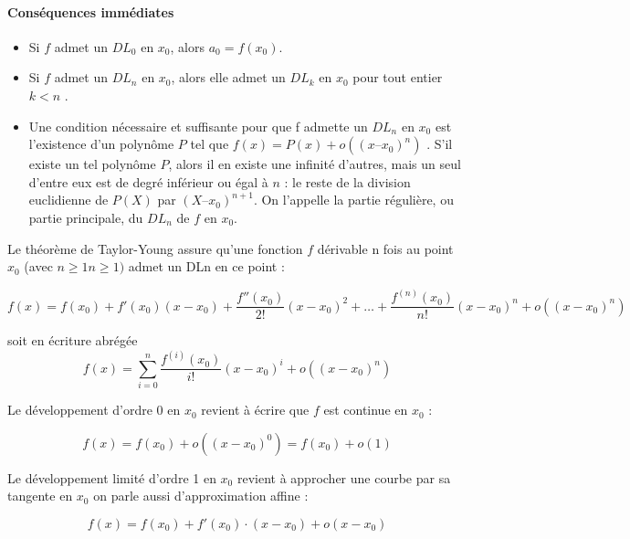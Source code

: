 		\paragraph*{Conséquences immédiates}
		\begin{itemize}
			\item Si $f$ admet un $DL_0$ en $x_0$, alors $a_0 = f(x_0)$. \cite{coulombeau2013math}
			\item Si $f$ admet un $DL_n$ en $x_0$, alors elle admet un $DL_k$ en $x_0$ pour tout entier $k < n$ \cite{coulombeau2013math}.
			\item Une condition nécessaire et suffisante pour que f admette un $DL_n$ en $x_0$ est l'existence d'un polynôme $P$ tel que $f(x) = P(x) + o((x – x_0)^n)$ \cite{coulombeau2013math}. S'il existe un tel polynôme $P$, alors il en existe une infinité d'autres, mais un seul d'entre eux est de degré inférieur ou égal à $n$ : le reste de la division euclidienne de $P(X)$ par $(X – x_0)^{n+1}$. On l'appelle la partie régulière, ou partie principale, du $DL_n$ de $f$ en $x_0$. %
		\end{itemize}
		
		
			
		Le théorème de Taylor-Young assure \cite{coulombeau2013math} qu'une fonction $f$ dérivable n fois au point $x_0$ (avec ${\displaystyle n\geq 1}n\geq 1)$ admet un DLn en ce point :
		
		$$
			{\displaystyle f(x)=f(x_{0})+f'(x_{0})(x-x_{0})+{\frac {f''(x_{0})}{2!}}(x-x_{0})^{2}+\dots +{\frac {f^{(n)}(x_{0})}{n!}}(x-x_{0})^{n}+o((x-x_{0})^{n})}
		$$
		
		soit en écriture abrégée
		$$
			f(x)=\sum _{{i=0}}^{n}{\frac  {f^{{(i)}}(x_{0})}{i!}}(x-x_{0})^{i}+o((x-x_{0})^{n})
		$$
		
		Le développement d'ordre $0$ en $x_0$ revient à écrire que $f$ est continue en $x_0$ :
		
		$$
		{\displaystyle f(x)=f(x_{0})+o((x-x_{0})^{0})=f(x_{0})+o(1)}
		$$
		
		Le développement limité d'ordre 1 en $x_0$ revient à approcher une courbe par sa tangente en $x_0$ on parle aussi d'approximation affine :
		
		$$
		f(x)=f(x_{0})+f'(x_{0})\cdot (x-x_{0})+o(x-x_{0})
		$$
		
			
